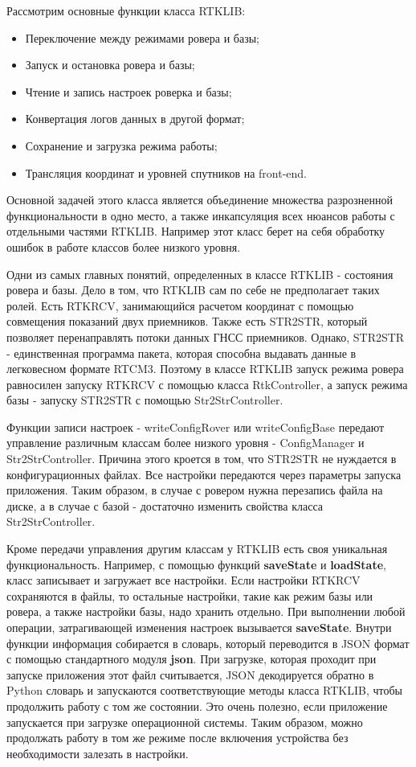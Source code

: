 Рассмотрим основные функции класса RTKLIB:

\begin{itemize}
  \item Переключение между режимами ровера и базы;
  \item Запуск и остановка ровера и базы;
  \item Чтение и запись настроек роверка и базы;
  \item Конвертация логов данных в другой формат;
  \item Сохранение и загрузка режима работы;
  \item Трансляция координат и уровней спутников на front-end.
\end{itemize}

Основной задачей этого класса является объединение множества разрозненной функциональности в одно место, а также инкапсуляция всех нюансов работы с отдельными частями RTKLIB. Например этот класс берет на себя обработку ошибок в работе классов более низкого уровня.

Одни из самых главных понятий, определенных в классе RTKLIB - состояния ровера и базы. Дело в том, что RTKLIB сам по себе не предполагает таких ролей. Есть RTKRCV, занимающийся расчетом координат с помощью совмещения показаний двух приемников. Также есть STR2STR, который позволяет перенаправлять потоки данных ГНСС приемников. Однако, STR2STR - единственная программа пакета, которая способна выдавать данные в легковесном формате RTCM3. Поэтому в классе RTKLIB запуск режима ровера равносилен запуску RTKRCV с помощью класса RtkController, а запуск режима базы - запуску STR2STR с помощью Str2StrController.

Функции записи настроек - writeConfigRover или writeConfigBase передают управление различным классам более низкого уровня - ConfigManager и Str2StrController. Причина этого кроется в том, что STR2STR не нуждается в конфигурационных файлах. Все настройки передаются через параметры запуска приложения. Таким образом, в случае с ровером нужна перезапись файла на диске, а в случае с базой - достаточно изменить свойства класса Str2StrController.

Кроме передачи управления другим классам у RTKLIB есть своя уникальная функциональность. Например, с помощью функций \textbf{saveState} и \textbf{loadState}, класс записывает и загружает все настройки. Если настройки RTKRCV сохраняются в файлы, то остальные настройки, такие как режим базы или ровера, а также настройки базы, надо хранить отдельно. При выполнении любой операции, затрагивающей изменения настроек вызывается \textbf{saveState}. Внутри функции информация собирается в словарь, который переводится в JSON формат с помощью стандартного модуля \textbf{json}. При загрузке, которая проходит при запуске приложения этот файл считывается, JSON декодируется обратно в Python словарь и запускаются соответствующие методы класса RTKLIB, чтобы продолжить работу с том же состоянии. Это очень полезно, если приложение запускается при загрузке операционной системы. Таким образом, можно продолжать работу в том же режиме после включения устройства без необходимости залезать в настройки.


